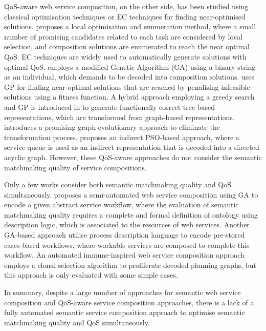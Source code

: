 \documentclass{llncs}
\begin{document}
QoS-aware web service composition, on the other side, has been studied using classical optimisation techniques or EC techniques for finding near-optimised solutions. \cite{qi2010combining} proposes a local optimisation and enumeration method, where a small number of promising candidates related to each task are considered by local selection, and composition solutions are enumerated to reach the near optimal QoS. EC techniques are widely used to automatically generate solutions with optimal QoS. \cite{gupta2015optimization} employs a modified Genetic Algorithm (GA) using a binary string as an individual, which demands to be decoded into composition solutions. \cite{yu2013adaptive} uses GP for finding near-optimal solutions that are reached by penalising infeasible solutions using a fitness function. A hybrid approach employing a greedy search and GP is introduced in \cite{ma2015hybrid} to generate functionally correct tree-based representations, which are transformed from graph-based representations. \cite{da2015graphevol} introduces a promising graph-evolutionary approach to eliminate the transformation process. \cite{da2016particle} proposes an indirect PSO-based approach, where a service queue is used as an indirect representation that is decoded into a directed acyclic graph. However, these QoS-aware approaches \cite{gupta2015optimization,qi2010combining,ma2015hybrid,da2016particle,da2015graphevol,yu2013adaptive} do not consider the semantic matchmaking quality of service compositions.

Only a few works \cite{fanjiang2014semantic,lecue2009optimizing,pop2009immune} consider both semantic matchmaking quality and QoS simultaneously. \cite{lecue2009optimizing} proposes a semi-automated web service composition using GA to encode a given abstract service workflow, where the evaluation of semantic matchmaking quality requires a complete and formal definition of ontology using description logic, which is associated to the resources of web services. Another GA-based approach \cite{fanjiang2014semantic} utilise process description language to encode pre-stored cases-based workflows, where workable services are composed to complete this workflow. An automated immune-inspired web service composition approach \cite{pop2009immune} employs a clonal selection algorithm to proliferate decoded planning graphs, but this approach is only evaluated with some simple cases.

In summary, despite a large number of approaches for semantic web service composition and QoS-aware service composition approaches, there is a lack of a fully automated semantic service composition approach to optimise semantic matchmaking quality and QoS simultaneously. 
\vspace{-0.3cm}
\end{document}

